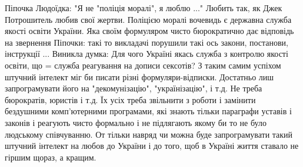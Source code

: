\begin{itemize}
\obeycr
Піпочка Людоїдка:
"Я не "поліція моралі", я люблю ..."
Любить так, як Джек Потрошитель любив свої жертви.
Поліцією моралі вочевидь є державна служба якості освіти України. Яка своїм формуляром чисто бюрократично дає відповідь на звернення Піпочки: такі то викладачі порушили такі ось закони, постанови, інструкції ...
Виникла думка:
Для чого Україні якась служба з контролю якості освіти, що = служба реагування на дописи сексотів?
З таким самим успіхом штучний інтелект міг би писати різні формуляри-відписки. Достатньо лиш запрограмувати його на "декомунізацію", "українізацію", і т.д. Не треба бюрократів, юристів і т.д. Їх усіх треба звільнити з роботи і замінити бездушними комп'ютерними програмами, які знають тільки параграфи уставів і законів і реагують чисто формально і не підлягають якому би то не було людському співчуванню.
От тільки навряд чи можна буде запрограмувати такий штучний інтелект на любов до України і до того, щоб в Україні життя ставало не гіршим щораз, а кращим.
\restorecr

\end{itemize}

